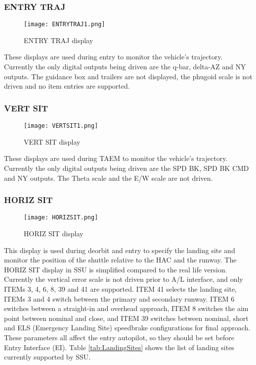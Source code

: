 \documentclass[Space_Shuttle_Ultra_Manual.tex]{subfiles}
\begin{document}
\begin{multicols*}{2}
\subsubsection{ENTRY TRAJ}
\begin{figure}[H]
  \texttt{[image: ENTRYTRAJ1.png]}
  \caption{ENTRY TRAJ display}
  \label{fig:ENTRY_TRAJ}
\end{figure}
These displays are used during entry to monitor the vehicle's trajectory. Currently the only digital outputs being driven are the q-bar, delta-AZ and NY outputs. The guidance box and trailers are not displayed, the phugoid scale is not driven and no item entries are supported.

\subsubsection{VERT SIT}
\begin{figure}[H]
  \texttt{[image: VERTSIT1.png]}
  \caption{VERT SIT display}
  \label{fig:VERT_SIT}
\end{figure}
These displays are used during TAEM to monitor the vehicle's trajectory. Currently the only digital outputs being driven are the SPD BK, SPD BK CMD and NY outputs. The Theta scale and the E/W scale are not driven.

\subsubsection{HORIZ SIT}
\begin{figure}[H]
  \texttt{[image: HORIZSIT.png]}
  \caption{HORIZ SIT display}
  \label{fig:HORIZ_SIT}
\end{figure}
This display is used during deorbit and entry to specify the landing site and monitor the position of the shuttle relative to the HAC and the runway.
The HORIZ SIT display in SSU is simplified compared to the real life version.
Currently the vertical error scale is not driven prior to A/L interface, and only ITEMs 3, 4, 6, 8, 39 and 41 are supported. 
ITEM 41 selects the landing site, ITEMs 3 and 4 switch between the primary and secondary runway. ITEM 6 switches between a straight-in and overhead approach, ITEM 8 switches the aim point between nominal and close, and ITEM 39 switches between nominal, short and ELS (Emergency Landing Site) speedbrake configurations for final approach.
These parameters all affect the entry autopilot, so they should be set before Entry Interface (EI).
Table \ref{tab:LandingSites} shows the list of landing sites currently supported by SSU.
\end{multicols*}
\end{document}
